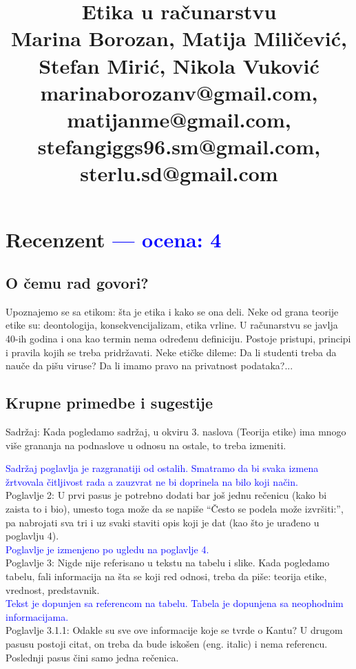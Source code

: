 \documentclass[a4paper]{report}
\newcommand{\odgovor}[1]{\textcolor{blue}{#1}}
\begin{document}
\title{Etika u računarstvu\\ \small{
	Marina Borozan, Matija Miličević,\\
	Stefan Mirić, Nikola Vuković\\
	marinaborozanv@gmail.com, matijanme@gmail.com,\\
	stefangiggs96.sm@gmail.com, sterlu.sd@gmail.com
}}

\maketitle

\tableofcontents

\chapter{Recenzent \odgovor{--- ocena: 4} }


\section{O čemu rad govori?}
Upoznajemo se sa etikom: šta je etika i kako se ona deli. Neke od grana teorije etike su: deontologija, konsekvencijalizam, etika vrline. U računarstvu se javlja 40-ih godina i ona kao termin nema određenu definiciju. Postoje pristupi, principi i pravila kojih se treba pridržavati. Neke etičke dileme: Da li studenti treba da nauče da pišu viruse? Da li imamo pravo na privatnost podataka?...

\section{Krupne primedbe i sugestije}
\textbullet Sadržaj: Kada pogledamo sadržaj, u okviru 3. naslova (Teorija etike) ima mnogo više grananja na podnaslove u odnosu na ostale, to treba izmeniti.

\odgovor{Sadržaj poglavlja je razgranatiji od ostalih. Smatramo da bi svaka izmena žrtvovala čitljivost rada a zauzvrat ne bi doprinela na bilo koji način. }
\\\textbullet Poglavlje 2: U prvi pasus je potrebno dodati bar još jednu rečenicu (kako bi zaista to i bio), umesto toga može da se napiše “Često se podela može izvršiti:”, pa nabrojati sva tri i uz svaki staviti opis koji je dat (kao što je urađeno u poglavlju 4). 
\\\odgovor{Poglavlje je izmenjeno po ugledu na poglavlje 4.}
\\\textbullet Poglavlje 3: Nigde nije referisano u tekstu na tabelu i slike. Kada pogledamo tabelu, fali informacija na šta se koji red odnosi, treba da piše: teorija etike, vrednost, predstavnik. 
\\\odgovor{Tekst je dopunjen sa referencom na tabelu. Tabela je dopunjena sa neophodnim informacijama. }
\\\textbullet Poglavlje 3.1.1: Odakle su sve ove informacije koje se tvrde o Kantu? U drugom pasusu postoji citat, on treba da bude iskošen (eng. italic) i nema referencu. Poslednji pasus čini samo jedna rečenica.
\end{document}
